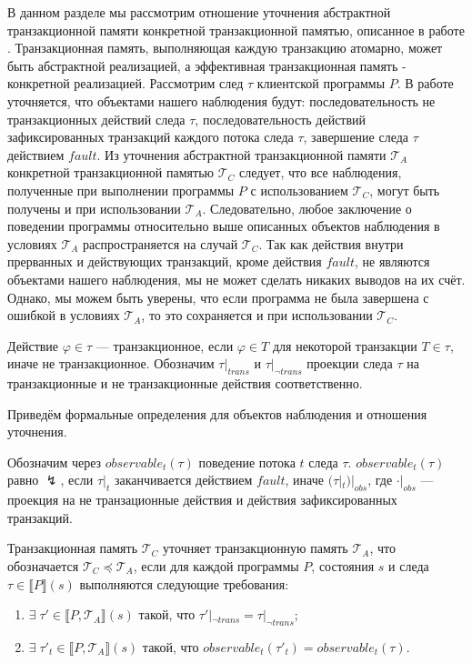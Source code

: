 В данном разделе мы рассмотрим отношение уточнения абстрактной транзакционной памяти конкретной транзакционной памятью, описанное в работе \cite{tms_article}. Транзакционная память, выполняющая каждую транзакцию атомарно, может быть абстрактной реализацией, а эффективная транзакционная память - конкретной реализацией. Рассмотрим след $\tau$ клиентской программы $P$. В работе \cite{tms_article} уточняется, что объектами нашего наблюдения будут: последовательность не транзакционных действий следа $\tau$, последовательность действий зафиксированных транзакций каждого потока следа $\tau$, завершение следа $\tau$ действием $fault$. Из уточнения абстрактной транзакционной памяти $\mathcal{T}_A$ конкретной транзакционной памятью $\mathcal{T}_C$ следует, что все наблюдения, полученные при выполнении программы $P$ с использованием $\mathcal{T}_C$, могут быть получены и при использовании $\mathcal{T}_A$. Следовательно, любое заключение о поведении программы относительно выше описанных объектов наблюдения в условиях $\mathcal{T}_A$ распространяется на случай $\mathcal{T}_C$. Так как действия внутри прерванных и действующих транзакций, кроме действия $fault$, не являются объектами нашего наблюдения, мы не может сделать никаких выводов на их счёт. Однако, мы можем быть уверены, что если программа не была завершена с ошибкой в условиях $\mathcal{T}_A$, то это сохраняется и при использовании $\mathcal{T}_C$.

Действие $\varphi \in \tau$ --- транзакционное, если $\varphi \in T$ для некоторой транзакции $T \in \tau$, иначе не транзакционное. Обозначим $\tau|_{trans}$ и $\tau|_{\neg trans}$ проекции следа $\tau$ на транзакционные и не транзакционные действия соответственно.

Приведём формальные определения для объектов наблюдения и отношения уточнения. 

\begin{mydefinition}
Обозначим через $observable_t(\tau)$ поведение потока $t$ следа $\tau$. $observable_t(\tau)$ равно $\lightning$, если $\tau|_t$ заканчивается действием $fault$, иначе $(\tau|_t)|_{obs}$, где $\cdot|_{obs}$ --- проекция на не транзационные действия и действия зафиксированных транзакций.
\end{mydefinition}

\begin{mydefinition}
Транзакционная память $\mathcal{T}_C$ уточняет транзакционную память $\mathcal{T}_A$, что обозначается $\mathcal{T}_C \preceq \mathcal{T}_A$, если для каждой программы $P$, состояния $s$ и следа $\tau \in \llbracket P \rrbracket(s)$ выполняются следующие требования: \begin{enumerate}[label=(\roman*)]
\item $\exists \; \tau' \in \llbracket P, \mathcal{T}_A \rrbracket(s)$ такой, что $\tau'|_{\neg trans} = \tau|_{\neg trans}$;
\item $\exists \; \tau'_t \in \llbracket P, \mathcal{T}_A \rrbracket(s)$ такой, что $observable_t(\tau'_t) = observable_t(\tau)$.
\end{enumerate} 
\end{mydefinition}

